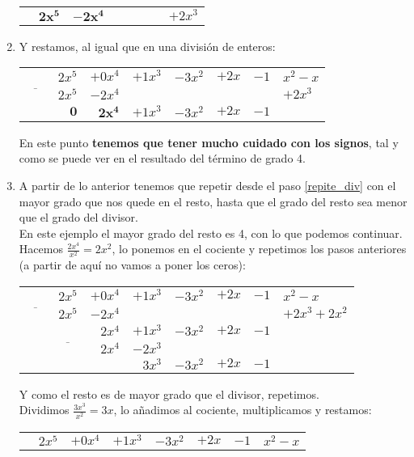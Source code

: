 \documentclass[a4paper,11pt,answers]{exam}
\begin{document}
\begin{enumerate}
\begin{center}
\begin{tabular}{rrrrrrrl}
       &$\boldsymbol{2x^5}$  &  $\boldsymbol{-2x^4}$&  &  &  & & $+2x^3$
     \end{tabular}
   \end{center}
 \item Y restamos, al igual que en una división de enteros:
   \begin{center}
     \begin{tabular}{rrrrrrrl}
 &$2x^5$&$+0x^4$  &$+1x^3$  &$-3x^2$  &$+2x$  & \multicolumn{1}{r|}{$-1$} &  $x^2 - x$\\ \cline{8-8} 
 $\overline{\phantom{AA}}$&$2x^5$  &  $-2x^4$&  &  &  & & $+2x^3$\\
       \cline{1-7}
       &$\boldsymbol{0}$  &  $\boldsymbol{2x^4}$&$+1x^3$&$-3x^2$&$+2x$&$-1$&
     \end{tabular}
   \end{center}
   En este punto \textbf{tenemos que tener mucho cuidado con los signos}, tal y como se puede ver en el resultado del término de grado 4.
 \item A partir de lo anterior tenemos que repetir desde el paso \ref{repite_div} con el mayor grado que nos quede en el resto, hasta que el grado del resto sea menor que el grado del divisor.\\
   En este ejemplo el mayor grado del resto es 4, con lo que podemos continuar. Hacemos $\frac{2x^4}{x^2} = 2x^2$, lo ponemos en el cociente y repetimos los pasos anteriores (a partir de aquí no vamos a poner los ceros):
   \begin{center}
     \begin{tabular}{rrrrrrrl}
 &$2x^5$&$+0x^4$  &$+1x^3$  &$-3x^2$  &$+2x$  & \multicolumn{1}{r|}{$-1$} &  $x^2 - x$\\ \cline{8-8} 
 $\overline{\phantom{AA}}$&$2x^5$  &  $-2x^4$&  &  &  & & $+2x^3+2x^2$\\
       \cline{1-7}
 &&  $2x^4$&$+1x^3$&$-3x^2$&$+2x$&$-1$&\\
 & $\overline{\phantom{AA}}$ &  $2x^4$&$-2x^3$&&&&\\
       \cline{2-7}
       &&&$3x^3$&$-3x^2$&$+2x$&$-1$&
     \end{tabular}
   \end{center}
   Y como el resto es de mayor grado que el divisor, repetimos.\\
   Dividimos $\frac{3x^3}{x^2} = 3x$, lo añadimos al cociente, multiplicamos y restamos:
   \begin{center}
     \begin{tabular}{rrrrrrrl}
 &$2x^5$&$+0x^4$  &$+1x^3$  &$-3x^2$  &$+2x$  & \multicolumn{1}{r|}{$-1$} &  $x^2 - x$\\ \cline{8-8} 

\end{tabular}
\end{center}
\end{enumerate}
\end{document}
